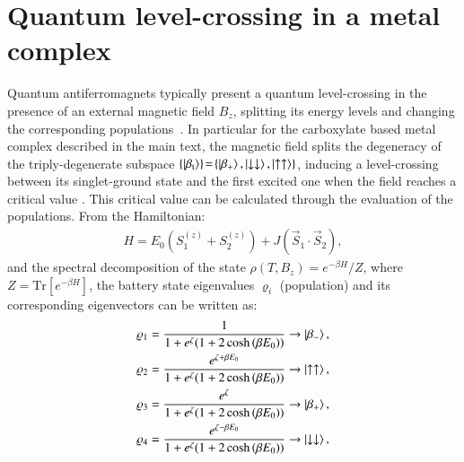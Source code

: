 \documentclass[aps,prl,epsfigure,twocolumn,superscriptaddress]{revtex4-1}
\newcommand{\1}{\mathbbm{1}}
\begin{document}
\twocolumngrid

\appendix

\setcounter{equation}{0}
\setcounter{figure}{0}
\setcounter{table}{0}

\renewcommand{\theequation}{S\arabic{equation}}
\renewcommand{\thefigure}{S\arabic{figure}}

\section{Quantum level-crossing in a metal complex}

Quantum antiferromagnets typically present a quantum level-crossing in the presence of an external magnetic field $B_z$, splitting its energy levels and changing the corresponding populations~\cite{chakraborty2019magnetocaloric,cruz2020quantifying,breunig2017quantum}. In particular for the carboxylate based metal complex described in the main text, the magnetic field splits the degeneracy of the triply-degenerate subspace $\{\ket{\beta_{\text{t}}}\}\!=\!\{\ket{\beta_{+}}, \ket{\downarrow\downarrow}, \ket{\uparrow\uparrow}\}$, inducing a level-crossing between its singlet-ground state and the first excited one when the field reaches a critical value \cite{chakraborty2019magnetocaloric,breunig2017quantum}. This  critical value can be calculated through the evaluation of the populations. From the Hamiltonian:
\begin{align}
H = E_{0} \left(S_{1}^{(z)}   + S_{2} ^{(z)}\right)+J \left( \vec{S}_{1} \cdot \vec{S}_{2} \right),
\label{hamiltonian}
\end{align}
and the spectral decomposition of the state $\rho(T,B_z)=e^{-\beta H}/Z$, where $Z=\mbox{Tr}{\left[e^{-\beta {H}}\right]}$, the battery state eigenvalues $\varrho_{i}$ (population) and its corresponding eigenvectors can be written as:
\begin{align}
\varrho_{1}&= \frac{1}{1 + e^{\zeta} ( 1 +  2 \cosh\left(\beta E_{0}\right))} \rightarrow \ket{\beta_{-}}, \label{x1}\\
\varrho_{2}&=\frac{ e^{\zeta + \beta E_{0}}}{1 + e^{\zeta} ( 1 +  2 \cosh\left(\beta E_{0}\right))} \rightarrow \ket{\uparrow\uparrow},\label{x2}\\
\varrho_{3}&=\frac{ e^{\zeta}}{1 + e^{\zeta} ( 1 +  2 \cosh\left(\beta E_{0}\right))} \rightarrow \ket{\beta_{+}},\label{x3}\\
\varrho_{4}&=\frac{e^{\zeta - \beta E_{0}}}{1 + e^{\zeta} ( 1 +  2 \cosh\left(\beta E_{0}\right))} \rightarrow \ket{\downarrow\downarrow}, \label{x4}
\end{align}
\end{document}
